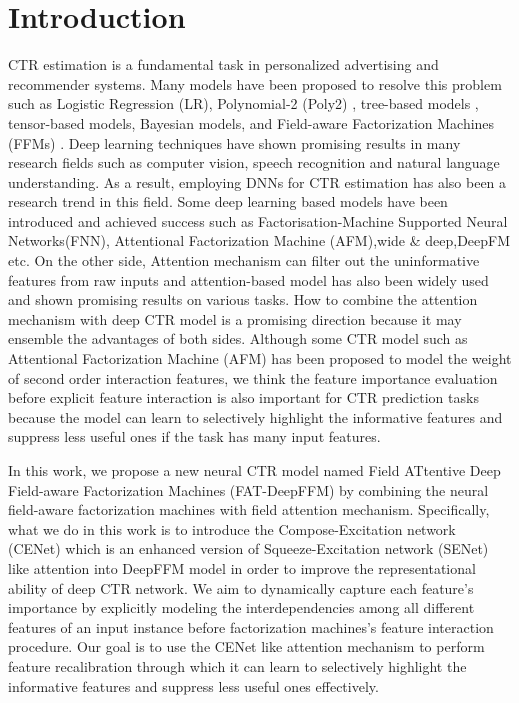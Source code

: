 \documentclass{article}
\begin{document}
\section{Introduction}
CTR estimation is a fundamental task in personalized advertising and recommender systems. Many models have been proposed to resolve this problem such as Logistic Regression (LR)\cite{mcmahan2013ad}, Polynomial-2 (Poly2) \cite{juan2016field}, tree-based models \cite{he2014practical}, tensor-based models\cite{koren2009matrix}, Bayesian models\cite{graepel2010web}, and Field-aware Factorization Machines (FFMs) \cite{juan2016field}. 
Deep learning techniques have shown promising results in many research fields such as computer vision\cite{krizhevsky2012imagenet,he2016deep}, speech recognition\cite{graves2013speech} and natural language understanding\cite{mikolov2010recurrent,cho2014learning}. As a result, employing DNNs for CTR estimation has also been a research trend in this field\cite{zhang2016deep,cheng2016wide,xiao2017attentional,guo2017deepfm,lian2018xdeepfm,wang2017deep,zhou2018deep,He2017NFM}. Some deep learning based models have been introduced and achieved success such as Factorisation-Machine Supported Neural Networks(FNN)\cite{zhang2016deep}, Attentional  Factorization Machine (AFM)\cite{xiao2017attentional},wide \& deep\cite{cheng2016wide},DeepFM\cite{guo2017deepfm} etc. On the other side, Attention mechanism can filter out the uninformative features from raw inputs and attention-based model has also been widely used and shown promising results on various tasks. How to combine the attention mechanism with deep CTR model is a promising direction because it may ensemble the advantages of both sides. Although some CTR model such as Attentional Factorization Machine\cite{xiao2017attentional} (AFM) has been proposed to model the weight of second order interaction features, we think the feature importance evaluation before explicit feature interaction is also important for CTR prediction tasks because the model can learn to selectively highlight the informative features and suppress less useful ones if the task has many input features.

In this work, we propose a new neural CTR model named Field ATtentive Deep Field-aware Factorization Machines (FAT-DeepFFM) by combining the neural field-aware factorization machines \cite{yang2017} with field attention mechanism. Specifically, what we do in this work is to introduce the Compose-Excitation network (CENet) which is an enhanced version of Squeeze-Excitation network (SENet) \cite{hu2017squeeze} like attention into DeepFFM model in order to improve the representational ability of deep CTR network. We aim to dynamically capture each feature's importance by explicitly modeling the interdependencies among all different features of an input instance before factorization machines's feature interaction procedure. Our goal is to use the CENet like attention mechanism to perform feature recalibration through which it can learn to selectively highlight the informative features and suppress less useful ones effectively.
\end{document}
